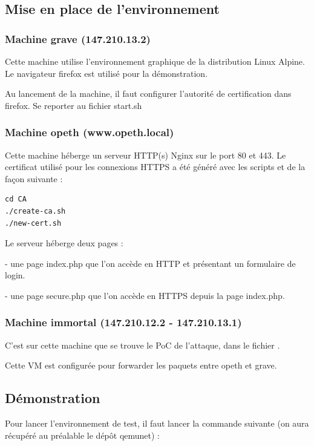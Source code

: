 \subsection{Mise en place de l'environnement}

\subsubsection{Machine grave (147.210.13.2)}

Cette machine utilise l'environnement graphique de la distribution Linux Alpine. Le navigateur firefox est utilisé pour la démonstration.

Au lancement de la machine, il faut configurer l'autorité de certification dans firefox. Se reporter au fichier start.sh

\subsubsection{Machine opeth (www.opeth.local)}

Cette machine héberge un serveur HTTP(s) Nginx sur le port 80 et 443. Le certificat utilisé pour les connexions HTTPS a été généré avec les scripts  et  de la façon suivante :

\begin{verbatim}
cd CA
./create-ca.sh
./new-cert.sh
\end{verbatim}

Le serveur héberge deux pages :

  - une page index.php que l'on accède en HTTP et présentant un formulaire de login.

  - une page secure.php que l'on accède en HTTPS depuis la page index.php.

\subsubsection{Machine immortal (147.210.12.2 - 147.210.13.1)}

C'est sur cette machine que se trouve le PoC de l'attaque, dans le fichier .

Cette VM est configurée pour forwarder les paquets entre opeth et grave.

\subsection{Démonstration}

Pour lancer l'environnement de test, il faut lancer la commande suivante (on aura récupéré au préalable le dépôt qemunet) :

